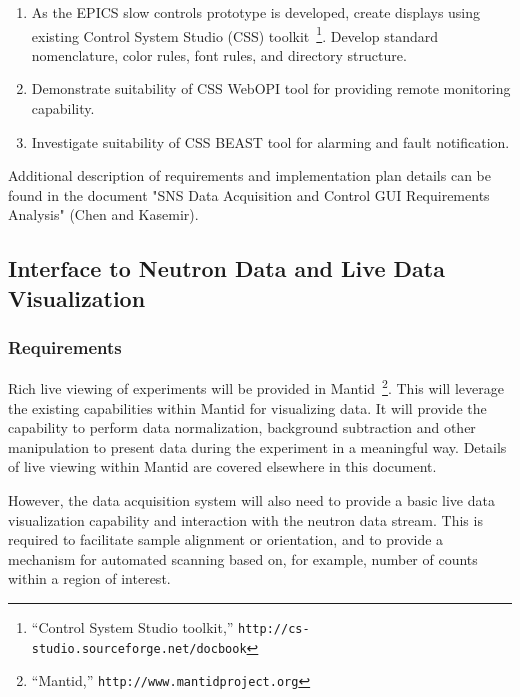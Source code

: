 \begin{enumerate}

\item As the EPICS slow controls prototype is developed,
create displays using existing Control System Studio
(CSS) toolkit~\footnote{``Control System Studio toolkit,''
\texttt{http://cs-studio.sourceforge.net/docbook}}. Develop standard
nomenclature, color rules, font rules, and directory structure.


\item Demonstrate suitability of CSS WebOPI tool for providing remote
monitoring capability.

\item Investigate suitability of CSS BEAST tool for alarming and fault
notification.

\end{enumerate}

Additional description of requirements and implementation plan details
can be found in the document "SNS Data Acquisition and Control GUI
Requirements Analysis" (Chen and Kasemir).

\subsection{Interface to Neutron Data and Live Data Visualization}

\subsubsection{Requirements}

Rich live viewing of experiments will be provided in
Mantid~\footnote{``Mantid,'' \texttt{http://www.mantidproject.org}}.
This will leverage the existing capabilities within Mantid for visualizing
data. It will provide the capability to perform data normalization,
background subtraction and other manipulation to present data during the
experiment in a meaningful way. Details of live viewing within Mantid
are covered elsewhere in this document.

However, the data acquisition system will also need to provide a basic
live data visualization capability and interaction with the neutron data
stream. This is required to facilitate sample alignment or orientation,
and to provide a mechanism for automated scanning based on, for example,
number of counts within a region of interest.

